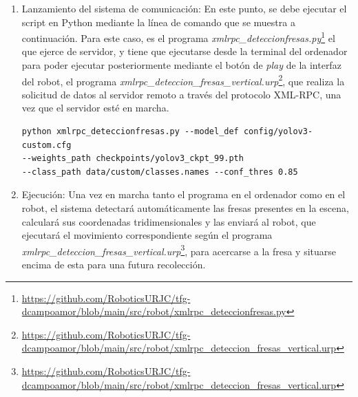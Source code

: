 \begin{enumerate}
  \item Lanzamiento del sistema de comunicación: En este punto, se debe ejecutar el script en Python mediante la línea de comando que se muestra a continuación. Para este caso, es el programa \textit{xmlrpc\_deteccionfresas.py}\footnote{\url{https://github.com/RoboticsURJC/tfg-dcampoamor/blob/main/src/robot/xmlrpc_deteccionfresas.py}} el que ejerce de servidor, y tiene que ejecutarse desde la terminal del ordenador para poder ejecutar posteriormente mediante el botón de \textit{play} de la interfaz del robot, el programa \textit{xmlrpc\_deteccion\_fresas\_vertical.urp}\footnote{\url{https://github.com/RoboticsURJC/tfg-dcampoamor/blob/main/src/robot/xmlrpc_deteccion_fresas_vertical.urp}}, que realiza la solicitud de datos al servidor remoto a través del protocolo XML-RPC, una vez que el servidor esté en marcha.
  
\small
\begin{verbatim}
python xmlrpc_deteccionfresas.py --model_def config/yolov3-custom.cfg 
--weights_path checkpoints/yolov3_ckpt_99.pth 
--class_path data/custom/classes.names --conf_thres 0.85 
\end{verbatim}  
\normalsize
    

  \item Ejecución: Una vez en marcha tanto el programa en el ordenador como en el robot, el sistema detectará automáticamente las fresas presentes en la escena, calculará sus coordenadas tridimensionales y las enviará al robot, que ejecutará el movimiento correspondiente según el programa \textit{xmlrpc\_deteccion\_fresas\_vertical.urp}\footnote{\url{https://github.com/RoboticsURJC/tfg-dcampoamor/blob/main/src/robot/xmlrpc_deteccion_fresas_vertical.urp}}, para acercarse a la fresa y situarse encima de esta para una futura recolección.
      
\end{enumerate}

